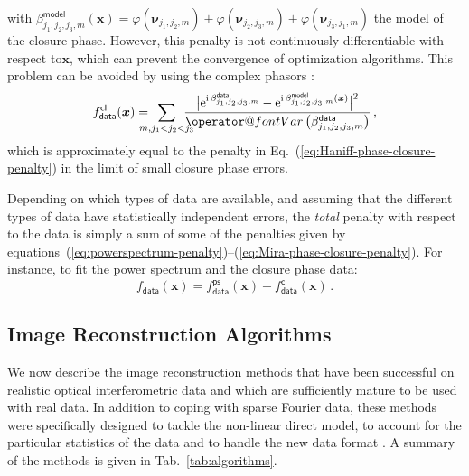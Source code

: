 \documentclass{article}
\makeatletter
\newcommand{\MathFunc}[1]{\mathop{\operator@font #1}\nolimits}
\newcommand{\Tag}[1]{\mathsf{#1}}        %
\newcommand{\V}[1]{\boldsymbol{#1}}      %
\newcommand{\Var}{\MathFunc{Var}}        %
\newcommand{\mathe}{\mathrm{e}}
\newcommand{\mathi}{\mathrm{i}}
\newcommand{\Paren}[1]{\left(#1\right)}
\newcommand{\wrt}{with respect to\xspace}
\newcommand{\Eq}[1]{Eq.~(\ref{#1})}
\newcommand{\Tab}[1]{Tab.~\ref{#1}}
\newcommand{\VisPhase}{\varphi}
\newcommand{\PhaseClosure}{\beta}
\newcommand{\Freq}{\nu}               %
\newcommand{\VFreq}{\V{\Freq}}
\newcommand{\Param}{x}
\newcommand{\VParam}{\V{\Param}}
\newcommand{\DataTag}{\Tag{data}}
\newcommand{\ModelTag}{\Tag{model}}
\newcommand{\PowerspectrumTag}{\Tag{ps}}
\newcommand{\PhaseClosureTag}{\Tag{cl}}
\newcommand{\Fcost}{f}
\newcommand{\Fdata}{\Fcost_\DataTag}
\makeatother
\begin{document}
with $\PhaseClosure_{j_1,j_2,j_3,m}^\ModelTag(\VParam) =
\VisPhase(\VFreq_{j_1,j_2,m}) + \VisPhase(\VFreq_{j_2,j_3,m}) +
\VisPhase(\VFreq_{j_3,j_1,m})$ the model of the closure phase.  However, this
penalty is not continuously differentiable \wrt $\VParam$, which can prevent
the convergence of optimization algorithms.  This problem can be avoided by
using the complex phasors \citep{Thiebaut-2008-Marseille}:
\begin{equation}
  \label{eq:Mira-phase-closure-penalty}
  \Fdata^\PhaseClosureTag(\VParam) =
  \hspace{-1em}\sum_{m, j_1 < j_2 < j_3}\hspace{-1em}
  \frac{
    \bigl\vert
      \mathe^{\mathi\,\PhaseClosure_{j_1,j_2,j_3,m}^\DataTag}
    - \mathe^{\mathi\,\PhaseClosure_{j_1,j_2,j_3,m}^\ModelTag(\VParam)}
    \bigr\vert^2
  }{\Var\Paren{\PhaseClosure_{j_1,j_2,j_3,m}^\DataTag}} \, ,
\end{equation}
which is approximately equal to the penalty in
\Eq{eq:Haniff-phase-closure-penalty} in the limit of small closure phase
errors.

Depending on which types of data are available, and assuming that the
different types of data have statistically independent errors, the
\emph{total} penalty \wrt the data is simply a sum of some of the penalties
given by
equations~(\ref{eq:powerspectrum-penalty})--(\ref{eq:Mira-phase-closure-penalty}).
For instance, to fit the power spectrum and the closure phase data:
\begin{equation}
  \Fdata(\VParam) = \Fdata^\PowerspectrumTag(\VParam) +
  \Fdata^\PhaseClosureTag(\VParam) \, .
\end{equation}


\subsection{Image Reconstruction Algorithms}
\label{sec:new-methods}

We now describe the image reconstruction methods that have been successful on
realistic optical interferometric data and which are sufficiently mature to be
used with real data.  In addition to coping with sparse Fourier data, these
methods were specifically designed to tackle the non-linear direct model, to
account for the particular statistics of the data
\citep{Meimon_et_al-2005-convex_approximation} and to handle the new data
format \citep{Pauls_et_al-2005-oifits}. A summary of the methods is given in
\Tab{tab:algorithms}.
\end{document}

